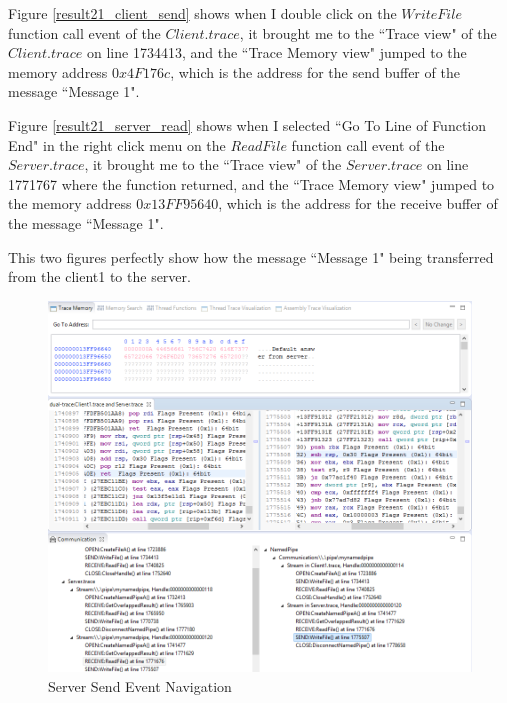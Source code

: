 Figure \ref{result21_client_send} shows when I double click on the $WriteFile$ function call event of the $Client.trace$, it brought me to the ``Trace view" of the $Client.trace$ on line 1734413, and the ``Trace Memory view" jumped to the memory address $0x4F176c$, which is the address for the send buffer of the message ``Message 1".

Figure \ref{result21_server_read} shows when I selected ``Go To Line of Function End" in the right click menu on the $ReadFile$ function call event of the $Server.trace$, it brought me to the ``Trace view" of the $Server.trace$ on line 1771767 where the function returned, and the ``Trace Memory view" jumped to the memory address $0x13FF95640$, which is the address for the receive buffer of the message ``Message 1".

This two figures perfectly show how the message ``Message 1" being transferred from the client1 to the server.

\begin{figure}[H]
\centerline{\includegraphics[scale=0.4]{Figures/result21_server_send}}
 \caption{Server Send Event Navigation}
\label{result21_server_send}
\end{figure}


